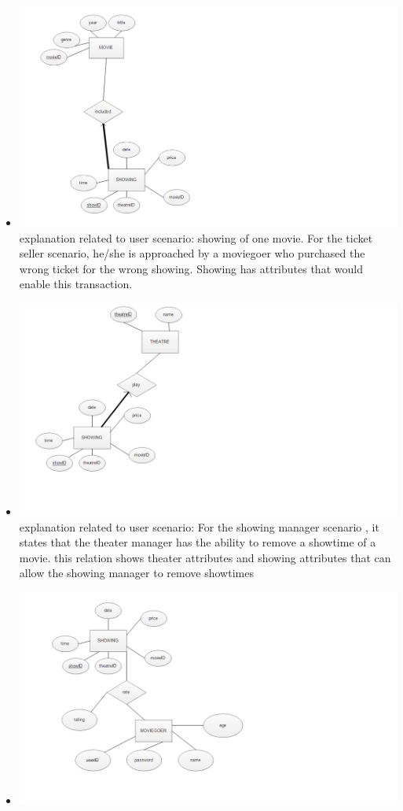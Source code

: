 {\begin{itemize}
when selecting a movie you can also select by director 
\item{ }
\includegraphics[scale=0.3]{MovieofShowing.png}
explanation related to user scenario: showing of one movie. For the ticket seller scenario, he/she is approached by a moviegoer who purchased the wrong ticket for the wrong showing. Showing has attributes that would enable this transaction. 
\item{ }
\includegraphics[scale=0.3]{ShowingPlayedinTheatre.png}
explanation related to user scenario: For the showing manager scenario , it states that the theater manager has the ability to remove a showtime of a movie. this relation shows theater attributes and showing attributes that can allow the showing manager to remove showtimes 
\item{ }
\includegraphics[scale=0.3]{MoviegoerrateShowing.png}

\end{itemize}}

